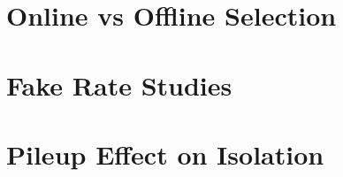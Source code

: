 \documentclass{cmspaper}
\begin{document}
  \section{Online vs Offline Selection}
     \label{app:online_vs_offline}
     
  \clearpage
  \section{Fake Rate Studies}
     \label{app:fake_rate_studies}
     
     
  \section{Pileup Effect on Isolation}
     \label{app:PUIso}
     
\end{document}

